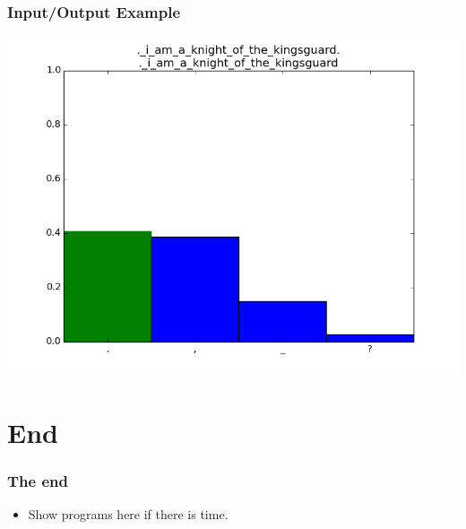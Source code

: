 \documentclass[12]{beamer}
\begin{document}
\begin{frame}
\frametitle{Input/Output Example}
\begin{center}
\includegraphics[scale=0.4]{../distplot/32.png}
\end{center}
\end{frame}



\section{End}
\begin{frame}
\frametitle{The end}
\begin{itemize}
\item<1-> Show programs here if there is time.
\end{itemize}
\end{frame}
\end{document}
